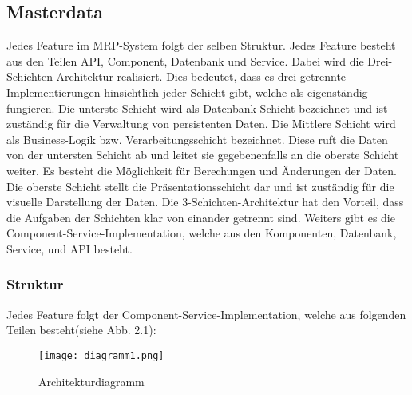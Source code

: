 \subsection{Masterdata}
Jedes Feature im MRP-System folgt der selben Struktur. Jedes Feature besteht aus den Teilen API, Component, Datenbank und Service. Dabei wird die Drei-Schichten-Architektur realisiert. Dies bedeutet, dass es drei getrennte Implementierungen hinsichtlich jeder Schicht gibt, welche als eigenständig fungieren. Die unterste Schicht wird als Datenbank-Schicht bezeichnet und ist zuständig für die Verwaltung von persistenten Daten. Die Mittlere Schicht wird als Business-Logik bzw. Verarbeitungsschicht bezeichnet. Diese ruft die Daten von der untersten Schicht ab und leitet sie gegebenenfalls an die oberste Schicht weiter. Es besteht die Möglichkeit für Berechungen und Änderungen der Daten. Die oberste Schicht stellt die Präsentationsschicht dar und ist zuständig für die visuelle Darstellung der Daten. Die 3-Schichten-Architektur hat den Vorteil, dass die Aufgaben der Schichten klar von einander getrennt sind. Weiters gibt es die Component-Service-Implementation, welche aus den Komponenten, Datenbank, Service, und API besteht.\cite{g3r,g3mrp}
\subsubsection{Struktur}
Jedes Feature folgt der Component-Service-Implementation, welche aus folgenden Teilen besteht(siehe Abb. 2.1)\cite{html5,g3r,g3rp,g3mrp}:\\
	\begin{figure}[H]
	\centering
		\texttt{[image: diagramm1.png]}
\caption{Architekturdiagramm}
\end{figure}

